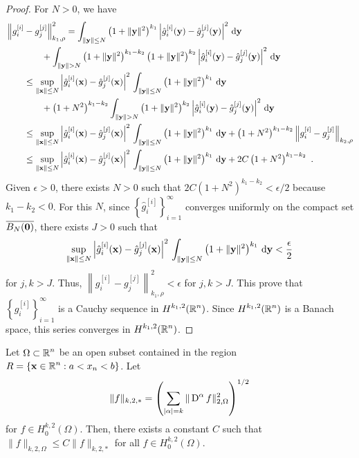 \begin{proof}
For $N>0$, we have
\begin{align*}
&\left\|g_i^{[i]} - g_j^{[j]} \right\|_{k_1,\rho}^2 =
\int_{\|\VEC{y}\|\leq N} \left(1+\|\VEC{y}\|^2\right)^{k_1}
\left| \hat{g}_i^{[i]}(\VEC{y}) - \hat{g}_j^{[j]}(\VEC{y})
\right|^2 \dx{\VEC{y}} \\
&\qquad \qquad +\int_{\|\VEC{y}\|> N} \left(1+\|\VEC{y}\|^2\right)^{k_1-k_2}
\left(1+\|\VEC{y}\|^2\right)^{k_2}
\left| \hat{g}_i^{[i]}(\VEC{y}) - \hat{g}_j^{[j]}(\VEC{y})
\right|^2 \dx{\VEC{y}} \\
&\qquad \leq \sup_{\|\VEC{x}\|\leq N}
\left| \hat{g}_i^{[i]}(\VEC{x}) - \hat{g}_j^{[j]}(\VEC{x}) \right|^2
\, \int_{\|\VEC{y}\|\leq N} \left(1+\|\VEC{y}\|^2\right)^{k_1}
\dx{\VEC{y}} \\
&\qquad \qquad + \left(1+N^2\right)^{k_1-k_2}
\int_{\|\VEC{y}\|> N} \left(1+\|\VEC{y}\|^2\right)^{k_2}
\left| \hat{g}_i^{[i]}(\VEC{y}) - \hat{g}_j^{[j]}(\VEC{y}) \right|^2
\dx{\VEC{y}} \\
&\qquad \leq \sup_{\|\VEC{x}\|\leq N}
\left| \hat{g}_i^{[i]}(\VEC{x}) - \hat{g}_j^{[j]}(\VEC{x}) \right|^2
\, \int_{\|\VEC{y}\|\leq N} \left(1+\|\VEC{y}\|^2\right)^{k_1}
\dx{\VEC{y}}
+ \left(1+N^2\right)^{k_1-k_2} \left\| g_i^{[i]}-g_j^{[j]}\right\|_{k_2,\rho} \\
&\qquad \leq \sup_{\|\VEC{x}\|\leq N}
\left| \hat{g}_i^{[i]}(\VEC{x}) - \hat{g}_j^{[j]}(\VEC{x}) \right|^2
\, \int_{\|\VEC{y}\|\leq N} \left(1+\|\VEC{y}\|^2\right)^{k_1}
\dx{\VEC{y}} +2C \left(1+N^2\right)^{k_1-k_2} \ .
\end{align*}
Given $\epsilon>0$, there exists $N>0$ such that
$\displaystyle 2C \left(1+N^2\right)^{k_1-k_2} < \epsilon/2$ because $k_1-k_2<0$.
For this $N$, since $\displaystyle \left\{ \hat{g}_i^{[i]} \right\}_{i=1}^\infty$
converges uniformly on the compact set $\overline{B_N(\mathbf{0})}$,
there exists $J>0$ such that
\[
\sup_{\|\mathbf{x}\|\leq N}
\left| \hat{g}_i^{[i]}(\mathbf{x}) - \hat{g}_j^{[j]}(\mathbf{x}) \right|^2
\, \int_{\|\mathbf{y}\|\leq N} \left(1+\|\mathbf{y}\|^2\right)^{k_1}
\,\mathrm{d}{\mathbf{y}} < \frac{\epsilon}{2}
\]
for $j,k > J$.  Thus,
$\displaystyle \left\|g_i^{[i]} - g_j^{[j]}\right\|_{k_1,\rho}^2 < \epsilon$
for $j,k > J$.
This prove that $\displaystyle \left\{g_i^{[i]} \right\}_{i=1}^\infty$
is a Cauchy sequence in
$\displaystyle H^{k_1,2}(\mathbb{R}^n)$.  Since $\displaystyle H^{k_1,2}(\mathbb{R}^n)$
is a Banach space, this series converges in
$\displaystyle H^{k_1,2}(\mathbb{R}^n)$.
\end{proof}

\begin{theorem} \label{sob_pt_carre}
Let $\displaystyle \Omega \subset \mathbb{R}^n$ be an open subset contained
in the region $\displaystyle R= \{ \mathbf{x} \in \mathbb{R}^n : a < x_n < b \}$.  Let
\begin{equation} \label{sob_pc_norm}
\|f \|_{k,2,\ast} = \left( \sum_{|\alpha|=k}
\| \operatorname{D}^\alpha f \|_{2,\Omega}^2 \right)^{1/2}
\end{equation}
for $\displaystyle f \in H^{k,2}_0(\Omega)$.
Then, there exists a constant $C$ such that
$\displaystyle \|f\|_{k,2,\Omega} \leq C \| f \|_{k,2,\ast}$ for
all $\displaystyle f \in H^{k,2}_0(\Omega)$.
\end{theorem}

